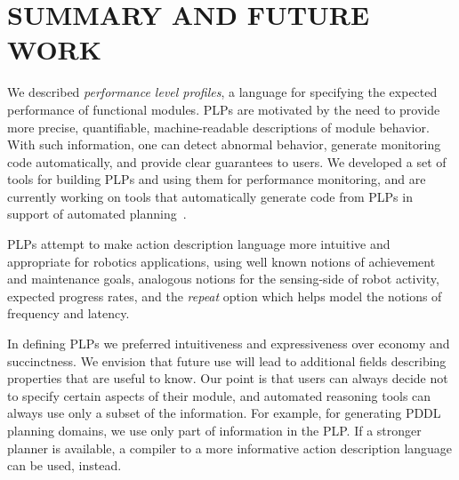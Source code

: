 \documentclass[ 5p, 12pt, times, twocolumn, sort&compress ]{elsarticle}
\newcommand\note[1]{\todo[inline, color=red!40]{#1}}
\begin{document}
\section{SUMMARY AND FUTURE WORK}
We described {\em performance level profiles\/},
a language for specifying the expected performance of functional modules. PLPs are motivated by the need to provide more precise, quantifiable,  machine-readable descriptions of module behavior. With such information, one can detect abnormal behavior, generate monitoring code automatically, and provide clear guarantees to users.
We developed a set of tools for building PLPs and using them for performance monitoring, and are currently working
on tools that automatically generate code from PLPs in support of automated planning~\cite{PlanRob16}.


PLPs attempt to make action description language more intuitive and appropriate for robotics applications,
using well known notions of achievement and maintenance goals, analogous notions for the sensing-side of robot activity, 
expected progress rates, and the {\em repeat\/} option which helps model the  notions of frequency and latency.


In defining PLPs we preferred intuitiveness and expressiveness over economy and succinctness. We envision that future use will lead to additional fields describing properties that are useful to know.
Our point is that users can always decide not to specify certain aspects of their module, and automated reasoning tools can always use only a subset of the information. For example, for generating PDDL planning domains, we use only part of information in the PLP. If a stronger planner is available, a compiler to a more informative action description language can be used, instead.
\end{document}
